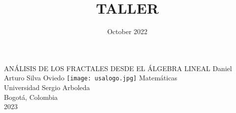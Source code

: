\documentclass{article}
\title{TALLER}
\author{ }
\date{October 2022}
\begin{document}

    \begin{titlepage}
        \begin{center}
        \large
        {
            \textsc{\Large{ANÁLISIS DE LOS FRACTALES DESDE EL ÁLGEBRA LINEAL}}
            \vfill
            Daniel Arturo Silva Oviedo
            \vfill
            \texttt{[image: usalogo.jpg]}
            \vfill
            \vspace{0.8cm}
            Matemáticas\\
            Universidad Sergio Arboleda\\
            Bogotá, Colombia\\
            2023
        }
        \end{center}
    \end{titlepage}
\end{document}
